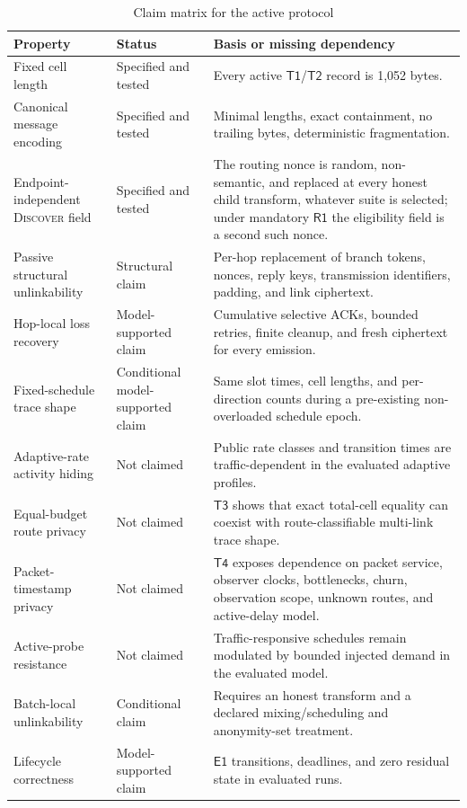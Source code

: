 \documentclass[11pt,oneside]{article}
\newcommand{\Eone}{\ensuremath{\mathsf{E1}}}
\newcommand{\Rone}{\ensuremath{\mathsf{R1}}}
\newcommand{\Tone}{\ensuremath{\mathsf{T1}}}
\newcommand{\Ttwo}{\ensuremath{\mathsf{T2}}}
\newcommand{\Tthree}{\ensuremath{\mathsf{T3}}}
\newcommand{\Tfour}{\ensuremath{\mathsf{T4}}}
\begin{document}
\begin{table}[ht]
\centering
\caption{Claim matrix for the active protocol}
\label{tab:claims}
\begin{tabularx}{\textwidth}{@{}p{}p{}X@{}}
\toprule
Property & Status & Basis or missing dependency \\
\midrule
Fixed cell length & Specified and tested & Every active \Tone{}/\Ttwo{} record is 1,052 bytes. \\
Canonical message encoding & Specified and tested & Minimal lengths, exact containment, no trailing bytes, deterministic fragmentation. \\
Endpoint-independent \textsc{Discover} field & Specified and tested & The routing nonce is random, non-semantic, and replaced at every honest child transform, whatever suite is selected; under mandatory \Rone{} the eligibility field is a second such nonce. \\
Passive structural unlinkability & Structural claim & Per-hop replacement of branch tokens, nonces, reply keys, transmission identifiers, padding, and link ciphertext. \\
Hop-local loss recovery & Model-supported claim & Cumulative selective ACKs, bounded retries, finite cleanup, and fresh ciphertext for every emission. \\
Fixed-schedule trace shape & Conditional model-supported claim & Same slot times, cell lengths, and per-direction counts during a pre-existing non-overloaded schedule epoch. \\
Adaptive-rate activity hiding & Not claimed & Public rate classes and transition times are traffic-dependent in the evaluated adaptive profiles. \\
Equal-budget route privacy & Not claimed & \Tthree{} shows that exact total-cell equality can coexist with route-classifiable multi-link trace shape. \\
Packet-timestamp privacy & Not claimed & \Tfour{} exposes dependence on packet service, observer clocks, bottlenecks, churn, observation scope, unknown routes, and active-delay model. \\
Active-probe resistance & Not claimed & Traffic-responsive schedules remain modulated by bounded injected demand in the evaluated model. \\
Batch-local unlinkability & Conditional claim & Requires an honest transform and a declared mixing/scheduling and anonymity-set treatment. \\
Lifecycle correctness & Model-supported claim & \Eone{} transitions, deadlines, and zero residual state in evaluated runs. \\

\end{tabularx}
\end{table}
\end{document}
